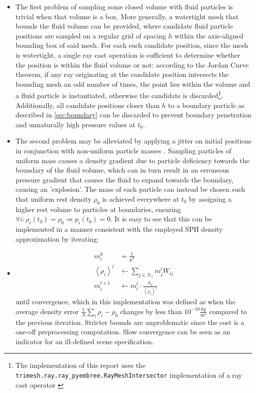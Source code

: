 \documentclass[oneside, a4paper]{book}
\newcommand\angled[1]{\left\langle#1\right\rangle}
\begin{document}
    \begin{itemize}
      \item  The first problem of sampling some closed volume with fluid particles is trivial when that volume is a box. More generally, a watertight mesh that bounds the fluid volume can be provided, where candidate fluid particle positions are sampled on a regular grid of spacing $h$ within the axis-aligned bounding box of said mesh. For each such candidate position, since the mesh is watertight, a single ray cast operation is sufficient to determine whether the position is within the fluid volume or not: according to the Jordan Curve theorem, if any ray originating at the candidate position intersects the bounding mesh an odd number of times, the point lies within the volume \autocite{point-in-polygon} and a fluid particle is instantiated, otherwise the candidate is discarded\footnote{The implementation of this report uses the \texttt{trimesh.ray.ray\_pyembree.RayMeshIntersector} implementation of a ray cast operator \autocite{trimesh}}. Additionally, all candidate positions closer than $h$ to a boundary particle as described in \autoref{sec:boundary} can be discarded to prevent boundary penetration and unnaturally high pressure values at $t_0$.
      \item The second problem may be alleviated by applying a jitter on initial positions in conjunction with non-uniform particle masses \autocite{labcourse}. Sampling particles of uniform mass causes a density gradient due to particle deficiency towards the boundary of the fluid volume, which can in turn result in an erroneous pressure gradient that causes the fluid to expand towards the boundary, causing an 'explosion'. The mass of each particle can instead be chosen such that uniform rest density $\rho_0$ is achieved everywhere at $t_0$ by assigning a higher rest volume to particles at boundaries, ensuring $\forall i: \rho_i(t_0)=\rho_0\Longrightarrow p_i(t_0)=0$. It is easy to see that this can be implemented in a manner consistent with the employed SPH density approximation by iterating:
      \item \begin{align}
        m_i^0 &= \frac{1}{h^d}\\
        \angled{\rho_i}^l &\gets \sum_{j\in\mathcal{N}_i} m_j^l W_{ij} \\
        m_i^{l+1} &\gets m_i^l \cdot \frac{\rho_0}{\angled{\rho_i}^l}\label{eq:initializing-fluid-rest-density}
      \end{align}
      until convergence, which in this implementation was defined as when the average density error $\frac{1}{N}\sum_{i}\rho_i - \rho_0$ changes by less than $10^{-10}\frac{\si{\kg}}{\si{\meter}^3}$ compared to the previous iteration. Stricter bounds are unproblematic since the cost is a one-off preprocessing computation. Slow convergence can be seen as an indicator for an ill-defined scene specification. 


\end{itemize}
\end{document}
